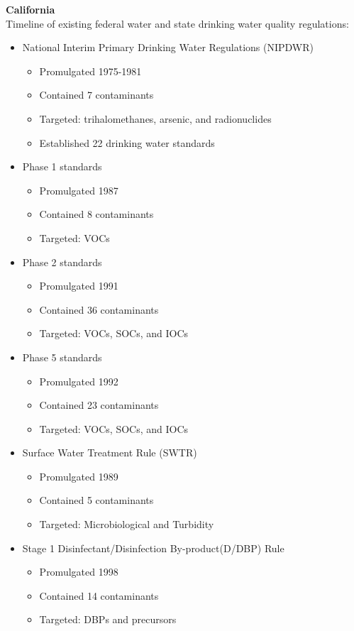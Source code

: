 \textbf{California}\\
Timeline of existing federal water and state drinking water quality regulations:
\begin{itemize}
\item National Interim Primary Drinking Water Regulations (NIPDWR)
\begin{itemize}
\item Promulgated 1975-1981
\item Contained 7 contaminants
\item Targeted: trihalomethanes, arsenic, and radionuclides
\item Established 22 drinking water standards
\end{itemize}
\item Phase 1 standards
\begin{itemize}
\item Promulgated 1987
\item Contained 8 contaminants
\item Targeted: VOCs
\end{itemize}
\item Phase 2 standards
\begin{itemize}
\item Promulgated 1991
\item Contained 36 contaminants
\item Targeted: VOCs, SOCs, and IOCs
\end{itemize}
\item Phase 5 standards
\begin{itemize}
\item Promulgated 1992
\item Contained 23 contaminants
\item Targeted: VOCs, SOCs, and IOCs
\end{itemize}
\item Surface Water Treatment Rule (SWTR)
\begin{itemize}
\item Promulgated 1989
\item Contained 5 contaminants
\item Targeted: Microbiological and Turbidity
\end{itemize}
\item Stage 1 Disinfectant/Disinfection By-product(D/DBP) Rule
\begin{itemize}
\item Promulgated 1998
\item Contained 14 contaminants
\item Targeted: DBPs and precursors

\end{itemize}
\end{itemize}
